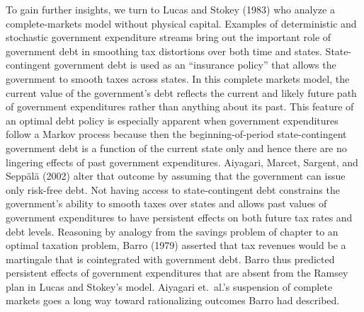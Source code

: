 To gain further insights,
we turn to Lucas and Stokey (1983)
who analyze a complete-markets model without physical capital.  Examples of deterministic
and stochastic government expenditure streams bring out the important
role of government debt in smoothing tax distortions over both time
and states. State-contingent government debt is used as an ``insurance policy'' that allows the government to smooth
taxes across  states.  In this complete markets model, the current value
of the government's debt reflects the current and likely future path
of government expenditures rather than anything about its past.  This
feature of an optimal debt policy is especially apparent when government
expenditures follow a Markov process because then the beginning-of-period
state-contingent government debt is a function of the current state only
and hence there are no lingering effects of past government expenditures.
 Aiyagari, Marcet, Sargent, and Sepp\"al\"a (2002)
alter that outcome %
by assuming that the government can  issue only risk-free debt. Not
having access to state-contingent debt constrains the government's
ability to smooth taxes over states and allows  past values of
government expenditures to have persistent effects on both future
tax rates and debt levels.  Reasoning by analogy from the savings
problem of chapter  to an optimal taxation
problem, Barro (1979) asserted that tax revenues would be  a \newpage \noindent 
martingale that is  cointegrated with government debt.
Barro thus predicted  persistent effects of
government expenditures that are absent from the Ramsey plan  in Lucas and Stokey's
model. Aiyagari et.\ al.'s suspension of complete markets  goes a long way  toward rationalizing
outcomes Barro had described.   


